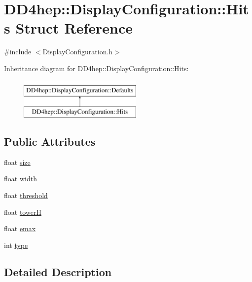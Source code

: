 \hypertarget{struct_d_d4hep_1_1_display_configuration_1_1_hits}{}\section{D\+D4hep\+:\+:Display\+Configuration\+:\+:Hits Struct Reference}
\label{struct_d_d4hep_1_1_display_configuration_1_1_hits}


{\ttfamily \#include $<$Display\+Configuration.\+h$>$}

Inheritance diagram for D\+D4hep\+:\+:Display\+Configuration\+:\+:Hits\+:\begin{figure}[H]
\begin{center}
\leavevmode
\includegraphics[height=2.000000cm]{struct_d_d4hep_1_1_display_configuration_1_1_hits}
\end{center}
\end{figure}
\subsection*{Public Attributes}
\begin{DoxyCompactItemize}
\item 
float \hyperlink{struct_d_d4hep_1_1_display_configuration_1_1_hits_ad11b0d78e70f65eab8742ec341a48bd8}{size}
\item 
float \hyperlink{struct_d_d4hep_1_1_display_configuration_1_1_hits_abf1d6b1a1ec5689bd11153429affb607}{width}
\item 
float \hyperlink{struct_d_d4hep_1_1_display_configuration_1_1_hits_ae708bf5cabed5cb9c82734b7bfac0373}{threshold}
\item 
float \hyperlink{struct_d_d4hep_1_1_display_configuration_1_1_hits_a5c2fc0074ea8321a2cea82b3fc856584}{towerH}
\item 
float \hyperlink{struct_d_d4hep_1_1_display_configuration_1_1_hits_ad38efa49f6d6183fd60e34e3d53756a1}{emax}
\item 
int \hyperlink{struct_d_d4hep_1_1_display_configuration_1_1_hits_ae126f3863288c51dc2633ba132e97bb0}{type}
\end{DoxyCompactItemize}


\subsection{Detailed Description}


